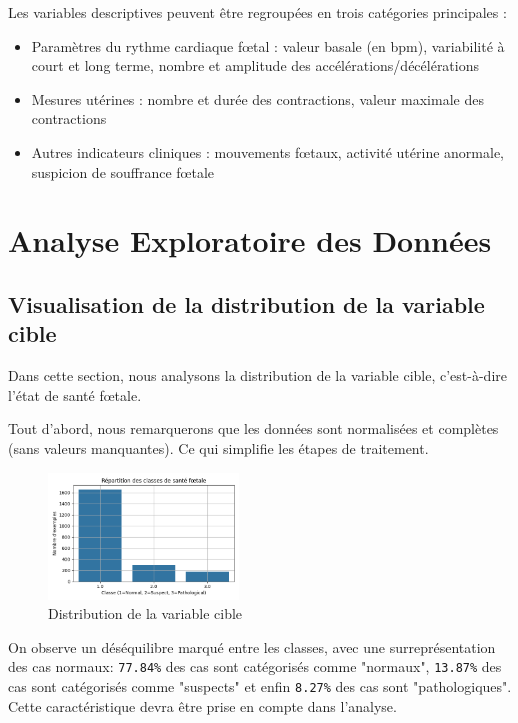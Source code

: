 \documentclass[twocolumn,10pt]{article}
\begin{document}
Les variables descriptives peuvent être regroupées en trois catégories principales :
\begin{itemize}
    \item Paramètres du rythme cardiaque fœtal : valeur basale (en bpm), variabilité à court et long terme, nombre et amplitude des accélérations/décélérations
    \item Mesures utérines : nombre et durée des contractions, valeur maximale des contractions
    \item Autres indicateurs cliniques : mouvements fœtaux, activité utérine anormale, suspicion de souffrance fœtale
\end{itemize}



\section{Analyse Exploratoire des Données}\label{sec:explor}


\subsection{Visualisation de la distribution de la variable cible}\label{subsec:explor:visu}

Dans cette section, nous analysons la distribution de la variable cible, c'est-à-dire l'état de santé fœtale.

Tout d'abord, nous remarquerons que les données sont normalisées et complètes (sans valeurs manquantes). Ce qui simplifie les étapes de traitement.

\begin{figure}[H]
    \centering
    \includegraphics[width=0.45\textwidth]{projet/Distribution_maladie.png}
    \caption{Distribution de la variable cible}
    \label{fig:hist_maladie}
\end{figure}

On observe un déséquilibre marqué entre les classes, avec une surreprésentation des cas normaux: \texttt{77.84\%} des cas sont catégorisés comme "normaux", \texttt{13.87\%} des cas sont catégorisés comme "suspects" et enfin \texttt{8.27\%} des cas sont "pathologiques". Cette caractéristique devra être prise en compte dans l'analyse. 
\end{document}
